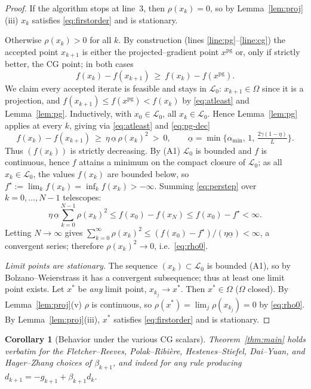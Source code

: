 \documentclass[12pt]{article}
\newtheorem{corollary}{Corollary}
\begin{document}
\begin{proof}
If the algorithm stops at line~3, then $\rho(x_k)=0$, so by
Lemma~\ref{lem:proj}(iii) $x_k$ satisfies \eqref{eq:firstorder} and is
stationary.

Otherwise $\rho(x_k)>0$ for all $k$. By construction (lines
\ref{line:pg}--\ref{line:cg}) the accepted point $x_{k+1}$ is either the
projected--gradient point $x^{\mathrm{pg}}$ or, only if strictly better, the CG
point; in both cases
\begin{equation}\label{eq:atleast}
f(x_k)-f(x_{k+1})\ \ge\ f(x_k)-f(x^{\mathrm{pg}}).
\end{equation}
We claim every accepted iterate is feasible and stays in $\mathcal L_0$:
$x_{k+1}\in\Omega$ since it is a projection, and $f(x_{k+1})\le
f(x^{\mathrm{pg}})<f(x_k)$ by \eqref{eq:atleast} and Lemma~\ref{lem:pg}.
Inductively, with $x_0\in\mathcal L_0$, all $x_k\in\mathcal L_0$. Hence
Lemma~\ref{lem:pg} applies at every $k$, giving via \eqref{eq:atleast} and
\eqref{eq:pg-dec}
\begin{equation}\label{eq:perstep}
f(x_k)-f(x_{k+1})\ \ge\ \eta\,\underline\alpha\,\rho(x_k)^2\ >\ 0,\qquad
\underline\alpha=\min\Big\{\alpha_{\min},\,1,\,\tfrac{2\gamma(1-\eta)}{L}\Big\}.
\end{equation}
Thus $(f(x_k))$ is strictly decreasing. By (A1) $\mathcal L_0$ is bounded and
$f$ is continuous, hence $f$ attains a minimum on the compact closure of
$\mathcal L_0$; as all $x_k\in\mathcal L_0$, the values $f(x_k)$ are bounded
below, so $f^\star:=\lim_k f(x_k)=\inf_k f(x_k)>-\infty$. Summing
\eqref{eq:perstep} over $k=0,\dots,N-1$ telescopes:
\[
\eta\,\underline\alpha\sum_{k=0}^{N-1}\rho(x_k)^2\le f(x_0)-f(x_N)\le f(x_0)-f^\star<\infty .
\]
Letting $N\to\infty$ gives
$\sum_{k=0}^\infty\rho(x_k)^2\le(f(x_0)-f^\star)/(\eta\underline\alpha)<\infty$,
a convergent series; therefore $\rho(x_k)^2\to0$, i.e.\ \eqref{eq:rho0}.

\emph{Limit points are stationary.} The sequence $(x_k)\subset\mathcal L_0$ is
bounded (A1), so by Bolzano--Weierstrass it has a convergent subsequence; thus
at least one limit point exists. Let $x^*$ be \emph{any} limit point,
$x_{k_j}\to x^*$. Then $x^*\in\Omega$ ($\Omega$ closed). By
Lemma~\ref{lem:proj}(v) $\rho$ is continuous, so
$\rho(x^*)=\lim_j\rho(x_{k_j})=0$ by \eqref{eq:rho0}. By
Lemma~\ref{lem:proj}(iii), $x^*$ satisfies \eqref{eq:firstorder} and is
stationary.
\end{proof}

\begin{corollary}[Behavior under the various CG scalars]
Theorem~\ref{thm:main} holds verbatim for the Fletcher--Reeves,
Polak--Ribi\`ere, Hestenes--Stiefel, Dai--Yuan, and Hager--Zhang choices of
$\beta_{k+1}$, and indeed for any rule producing
$d_{k+1}=-g_{k+1}+\beta_{k+1}d_k$.
\end{corollary}
\end{document}
